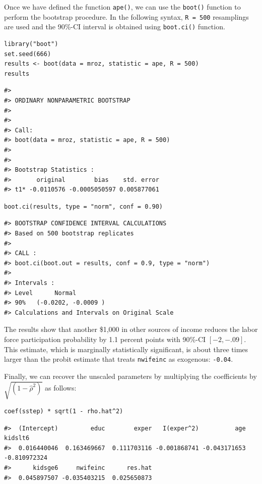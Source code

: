 Once we have defined the function \texttt{ape()}, we can use the \texttt{boot()} function to perform the bootstrap procedure. In the following syntax, \texttt{R\ =\ 500} resamplings are used and the 90\%-CI interval is obtained using \texttt{boot.ci()} function.

\begin{verbatim}
library("boot")
set.seed(666)
results <- boot(data = mroz, statistic = ape, R = 500)
results
\end{verbatim}

\begin{verbatim}
#> 
#> ORDINARY NONPARAMETRIC BOOTSTRAP
#> 
#> 
#> Call:
#> boot(data = mroz, statistic = ape, R = 500)
#> 
#> 
#> Bootstrap Statistics :
#>       original        bias    std. error
#> t1* -0.0110576 -0.0005050597 0.005877061
\end{verbatim}

\begin{verbatim}
boot.ci(results, type = "norm", conf = 0.90)
\end{verbatim}

\begin{verbatim}
#> BOOTSTRAP CONFIDENCE INTERVAL CALCULATIONS
#> Based on 500 bootstrap replicates
#> 
#> CALL : 
#> boot.ci(boot.out = results, conf = 0.9, type = "norm")
#> 
#> Intervals : 
#> Level      Normal        
#> 90%   (-0.0202, -0.0009 )  
#> Calculations and Intervals on Original Scale
\end{verbatim}

The results show that another \$1,000 in other sources of income reduces the labor force participation probability by 1.1 percent points with 90\%-CI \(\left[-2, -.09\right]\). This estimate, which is marginally statistically significant, is about three times larger than the probit estimate that treats \texttt{nwifeinc} as exogenous: \texttt{-0.04}.

Finally, we can recover the unscaled parameters by multiplying the coefficients by \(\sqrt{\left(1 - \widehat{\rho}^2\right)}\) as follows:

\begin{verbatim}
coef(sstep) * sqrt(1 - rho.hat^2)
\end{verbatim}

\begin{verbatim}
#>  (Intercept)         educ        exper   I(exper^2)          age      kidslt6 
#>  0.016440046  0.163469667  0.111703116 -0.001868741 -0.043171653 -0.810972324 
#>      kidsge6     nwifeinc      res.hat 
#>  0.045897507 -0.035403215  0.025650873
\end{verbatim}


